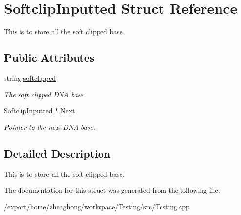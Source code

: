 \hypertarget{struct_softclip_inputted}{\section{Softclip\+Inputted Struct Reference}
\label{struct_softclip_inputted}
}


This is to store all the soft clipped base.  


\subsection*{Public Attributes}
\begin{DoxyCompactItemize}
\item 
\hypertarget{struct_softclip_inputted_a8abc3fbcbfc5ce45a815276c83f89aa2}{string \hyperlink{struct_softclip_inputted_a8abc3fbcbfc5ce45a815276c83f89aa2}{softclipped}}\label{struct_softclip_inputted_a8abc3fbcbfc5ce45a815276c83f89aa2}

\begin{DoxyCompactList}\small\item\em The soft clipped D\+N\+A base. \end{DoxyCompactList}\item 
\hypertarget{struct_softclip_inputted_a1f264d23c9a40fe1f33446bbba6ad951}{\hyperlink{struct_softclip_inputted}{Softclip\+Inputted} $\ast$ \hyperlink{struct_softclip_inputted_a1f264d23c9a40fe1f33446bbba6ad951}{Next}}\label{struct_softclip_inputted_a1f264d23c9a40fe1f33446bbba6ad951}

\begin{DoxyCompactList}\small\item\em Pointer to the next D\+N\+A base. \end{DoxyCompactList}\end{DoxyCompactItemize}


\subsection{Detailed Description}
This is to store all the soft clipped base. 

The documentation for this struct was generated from the following file\+:\begin{DoxyCompactItemize}
\item 
/export/home/zhenghong/workspace/\+Testing/src/Testing.\+cpp\end{DoxyCompactItemize}
